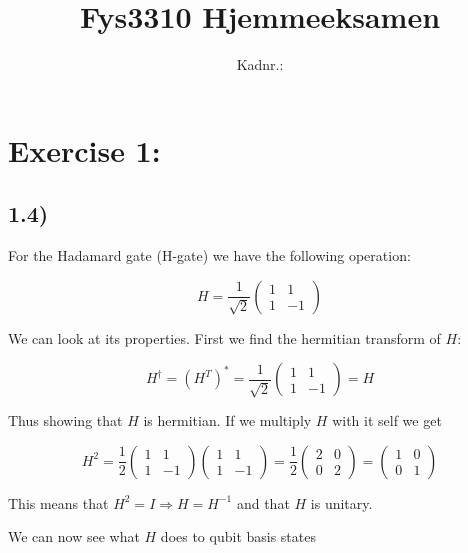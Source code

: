 \documentclass[a4paper,norsk, 10pt]{article}
\title{Fys3310 Hjemmeeksamen}
\author{Kadnr.: }
\begin{document}
\maketitle

\section{Exercise 1:}
\subsection{1.4)}
For the Hadamard gate (H-gate) we have the following operation:

\begin{equation}
H = \frac{1}{\sqrt{2}}
\begin{pmatrix}
1 & 1 \\
1 & -1
\end{pmatrix}
\end{equation}\label{eq:H}

We can look at its properties. First we find the hermitian transform of $H$:

\begin{equation}
H^\dagger = (H^T)^* = 
\frac{1}{\sqrt{2}}
\begin{pmatrix}
1 & 1 \\
1 & -1
\end{pmatrix}
= H
\end{equation}

Thus showing that $H$ is hermitian. If we multiply $H$ with it self we get

\begin{equation}
H^2 = \frac{1}{2}
\begin{pmatrix}
1 & 1 \\
1 & -1
\end{pmatrix}
\begin{pmatrix}
1 & 1 \\
1 & -1
\end{pmatrix}
=\frac{1}{2}
\begin{pmatrix}
2 & 0 \\
0 & 2
\end{pmatrix}
=
\begin{pmatrix}
1 & 0 \\
0 & 1
\end{pmatrix}
\end{equation}

This means that $H^2 = I \Rightarrow H = H^{-1}$ and that $H$ is unitary.

We can now see what $H$ does to qubit basis states
\end{document}
